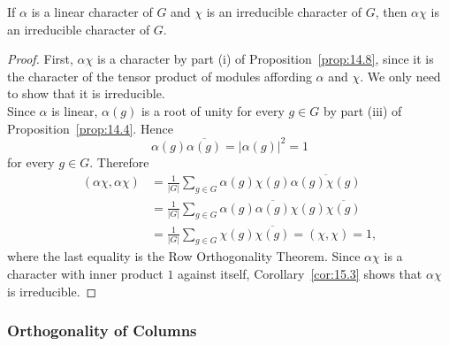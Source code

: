 \documentclass[../Odyssey_Project.tex]{subfiles}
\begin{document}
\begin{proposition}
\label{prop:15.5}
If $\alpha$ is a linear character of $G$ and $\chi$ is an irreducible character of $G$, then $\alpha\chi$ is an irreducible character of $G$.
\end{proposition}
\begin{proof}
    First, $\alpha\chi$ is a character by part (i) of Proposition~\ref{prop:14.8}, since it is the character of the tensor product of modules affording $\alpha$ and $\chi$. We only need to show that it is irreducible.\\
    Since $\alpha$ is linear, $\alpha(g)$ is a root of unity for every $g\in G$ by part (iii) of Proposition~\ref{prop:14.4}. Hence
    \[
        \alpha(g)\overline{\alpha(g)}=|\alpha(g)|^2=1
    \]
    for every $g\in G$. Therefore
    \begin{align*}
        (\alpha\chi,\alpha\chi)
        &=\frac{1}{|G|}\sum_{g\in G}\alpha(g)\chi(g)\overline{\alpha(g)\chi(g)} \\
        &=\frac{1}{|G|}\sum_{g\in G}\alpha(g)\overline{\alpha(g)}\chi(g)\overline{\chi(g)} \\
        &=\frac{1}{|G|}\sum_{g\in G}\chi(g)\overline{\chi(g)}
        =
        (\chi,\chi)
        =
        1,
    \end{align*}
    where the last equality is the Row Orthogonality Theorem. Since $\alpha\chi$ is a character with inner product $1$ against itself, Corollary~\ref{cor:15.3} shows that $\alpha\chi$ is irreducible.
\end{proof}

\subsubsection*{Orthogonality of Columns}
\end{document}
